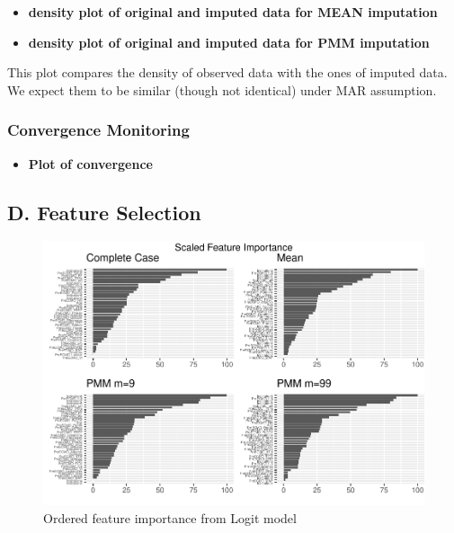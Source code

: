 \documentclass[12pt,]{article}
\providecommand{\tightlist}{%
  \setlength{\itemsep}{0pt}\setlength{\parskip}{0pt}}
\newcommand{\appendixD}{ \setcounter{table}{0} \renewcommand{\thetable}{D\arabic{table}} \setcounter{figure}{0} \renewcommand{\thefigure}{D\arabic{figure}} }
\begin{document}
\begin{itemize}
\tightlist
\item
  \textbf{density plot of original and imputed data for MEAN imputation}
\item
  \textbf{density plot of original and imputed data for PMM imputation}
\end{itemize}

This plot compares the density of observed data with the ones of imputed
data. We expect them to be similar (though not identical) under MAR
assumption.

\subsubsection{Convergence Monitoring}\label{convergence-monitoring}

\begin{itemize}
\tightlist
\item
  \textbf{Plot of convergence}
\end{itemize}

\subsection*{D. Feature Selection}\label{d.-feature-selection}

\appendixD

\begin{figure}[H]

{\centering \includegraphics[width=1\linewidth]{figure/graphics-unnamed-chunk-16-1} 

}

\caption{\label{fig:rfe-logit}Ordered feature importance from Logit model}\label{fig:unnamed-chunk-16}
\end{figure}
\end{document}
